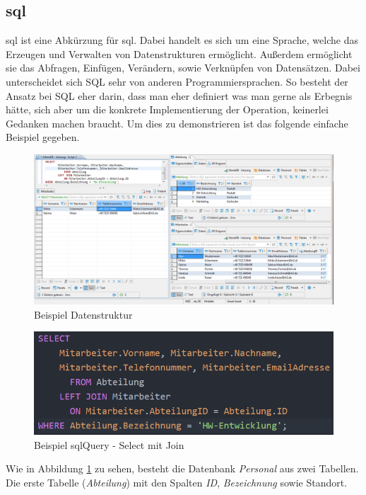 \subsection{\acs{sql}}
\acs{sql} ist eine Abkürzung für \acl{sql}. Dabei handelt es sich um eine Sprache, welche das Erzeugen und Verwalten von Datenstrukturen ermöglicht. Außerdem ermöglicht sie das Abfragen, Einfügen, Verändern, sowie Verknüpfen von Datensätzen.
Dabei unterscheidet sich SQL sehr von anderen Programmiersprachen.
So besteht der Ansatz bei SQL eher darin, dass man eher definiert was man gerne als Erbegnis hätte, sich aber um die konkrete Implementierung der Operation, keinerlei Gedanken machen braucht.
Um dies zu demonstrieren ist das folgende einfache Beispiel gegeben.
\begin{figure}[hbt]
  	\centering
    \includegraphics[width=\textwidth]{content/hauptteil/theoretischeGrundlagen/rec/exampleSQL.png}
	\caption{Beispiel Datenstruktur}
 	\label{fig:exampleSQLStructure}
\end{figure}
\begin{figure}[hbt]
  	\centering
    \includegraphics[width=\textwidth]{content/hauptteil/theoretischeGrundlagen/rec/sqlQuery.png}
	\caption{Beispiel sqlQuery - Select mit Join}
 	\label{fig:exampleSQLQuery}
\end{figure}
Wie in Abbildung \ref{fig:exampleSQLStructure} zu sehen, besteht die Datenbank \emph{Personal} aus zwei Tabellen.
Die erste Tabelle (\emph{Abteilung}) mit den Spalten \emph{ID}, \emph{Bezeichnung} sowie Standort.
